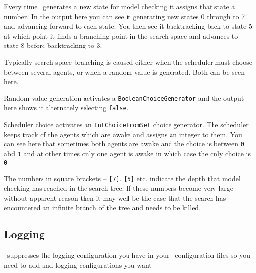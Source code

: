 \documentclass[a4]{article}
\begin{document}
Every time \jpf\ generates a new state for model checking it assigns that state a number.  In the output here you can see it generating new states 0 through to 7 and advancing forward to each state.  You then see it backtracking back to state 5 at which point it finds a branching point in the search space and advances to state 8 before backtracking to 3.

Typically search space branching is caused either when the scheduler must choose between several agents, or when a random value is generated.  Both can be seen here.

Random value generation activates a \texttt{BooleanChoiceGenerator} and the output here shows it alternately selecting  \texttt{false}.

Scheduler choice activates an \texttt{IntChoiceFromSet} choice generator.  The scheduler keeps track of the agents which are awake and assigns an integer to them.  You can see here that sometimes both agents are awake and the choice is between \texttt{0} abd \texttt{1} and at other times only one agent is awake in which case the only choice is \texttt{0}

The numbers in square brackets -- \texttt{[7]}, \texttt{[6]} etc. indicate the depth that model checking has reached in the search tree.  If these numbers become very large without apparent reason then it may well be the case that the search has encountered an infinite branch of the tree and needs to be killed.

\subsection{Logging}
\jpf\ suppresses the logging configuration you have in your \ail\ configuration files so you need to add and logging configurations you want 
\end{document}

